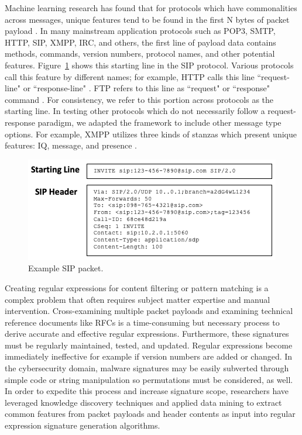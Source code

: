Machine learning research has found that for protocols which have commonalities across messages, unique features tend to be found in the first N bytes of packet payload \cite{wangxiang}. In many mainstream application protocols such as POP3, SMTP, HTTP, SIP, XMPP, IRC, and others, the first line of payload data contains methods, commands, version numbers, protocol names, and other potential features. Figure~\ref{f:sippacket} shows this starting line in the SIP protocol. Various protocols call this feature by different names; for example, HTTP calls this line ``request-line" or ``response-line" \cite{rfc2616}. FTP refers to this line as ``request" or ``response" command \cite{rfc959}. For consistency, we refer to this portion across protocols as the starting line. In testing other protocols which do not necessarily follow a request-response paradigm, we adapted the framework to include other message type options. For example, XMPP utilizes three kinds of stanzas which present unique features: IQ, message, and presence \cite{rfc6120}.

\begin{figure}[hbt!]
  \begin{center}
    \includegraphics[width=0.7\columnwidth]{chapters/3/img/SIPpacket.png}
    \caption{Example SIP packet.}
    \label{f:sippacket}
  \end{center}
\end{figure}


Creating regular expressions for content filtering or pattern matching  is a complex problem that often requires subject matter expertise and manual intervention. Cross-examining multiple packet payloads and examining technical reference documents like RFCs is a time-consuming but necessary process to derive accurate and effective regular expressions. Furthermore, these signatures must be regularly maintained, tested, and updated. Regular expressions become immediately ineffective for example if version numbers are added or changed. In the cybersecurity domain, malware signatures may be easily subverted through simple code or string manipulation so permutations must be considered, as well. In order to expedite this process and increase signature scope, researchers have leveraged knowledge discovery techniques and applied data mining to extract common features from packet payloads and header contents as input into regular expression signature generation algorithms.
